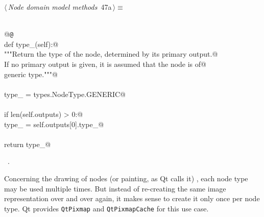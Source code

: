 \documentclass[
    a4paper,      %
    10pt,         %
    openright,    %
    notitlepage,  %
    parskip=half, %
]{scrreprt}       %
\theoremstyle{definition}                    %
\begin{document}
\begin{flushleft} \small
\begin{minipage}{\linewidth}\label{scrap63}\raggedright\small
{} $\langle\,${\itshape Node domain model methods}\nobreak\ {\footnotesize {47a}}$\,\rangle\equiv$
\vspace{-1ex}
\begin{list}{}{} \item
\mbox{}\lstinline@@\\
\mbox{}\lstinline@    @{\tt @}\lstinline@property@\\
\mbox{}\lstinline@    def type_(self):@\\
\mbox{}\lstinline@        """Return the type of the node, determined by its primary output.@\\
\mbox{}\lstinline@        If no primary output is given, it is assumed that the node is of@\\
\mbox{}\lstinline@        generic type."""@\\
\mbox{}\lstinline@@\\
\mbox{}\lstinline@        type_ = types.NodeType.GENERIC@\\
\mbox{}\lstinline@@\\
\mbox{}\lstinline@        if len(self.outputs) > 0:@\\
\mbox{}\lstinline@            type_ = self.outputs[0].type_@\\
\mbox{}\lstinline@@\\
\mbox{}\lstinline@        return type_@\\
\mbox{}\lstinline@@{\NWsep}
\end{list}
\vspace{-1.5ex}
\footnotesize
\begin{list}{}{\setlength{\itemsep}{-\parsep}\setlength{\itemindent}{-\leftmargin}}
\item \NWtxtMacroRefIn\ .

\item{}
\end{list}
\end{minipage}\vspace{4ex}
\end{flushleft}
Concerning the drawing of nodes (or painting, as Qt calls it) , each node type
may be used multiple times. But instead of re-creating the same image
representation over and over again, it makes sense to create it only once per
node type. Qt provides \verb+QtPixmap+ and \verb+QtPixmapCache+ for this use case.
\end{document}
